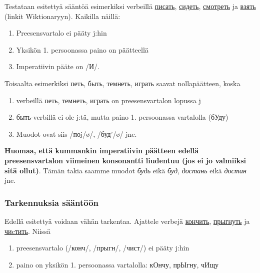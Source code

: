\documentclass[]{scrartcl}
\providecommand{\tightlist}{%
  \setlength{\itemsep}{0pt}\setlength{\parskip}{0pt}}
\begin{document}
Testataan esitettyä sääntöä esimerkiksi verbeillä
\href{http://ru.wiktionary.org/wiki/\%D0\%BF\%D0\%B8\%D1\%81\%D0\%B0\%D1\%82\%D1\%8C}{писать},
\href{http://ru.wiktionary.org/wiki/\%D1\%81\%D0\%B8\%D0\%B4\%D0\%B5\%D1\%82\%D1\%8C}{сидеть},
\href{http://ru.wiktionary.org/wiki/\%D1\%81\%D0\%BC\%D0\%BE\%D1\%82\%D1\%80\%D0\%B5\%D1\%82\%D1\%8C}{смотреть}
ja
\href{http://ru.wiktionary.org/wiki/\%D0\%B2\%D0\%B7\%D1\%8F\%D1\%82\%D1\%8C}{взять}
(linkit Wiktionaryyn). Kaikilla näillä:

\begin{enumerate}
\def\labelenumi{\arabic{enumi}.}
\tightlist
\item
  Preesensvartalo ei pääty j:hin
\item
  Yksikön 1. persoonassa paino on päätteellä
\item
  Imperatiivin pääte on /И/.
\end{enumerate}

Toisaalta esimerkiksi петь, быть, темнеть, играть saavat nollapäätteen,
koska

\begin{enumerate}
\def\labelenumi{\arabic{enumi}.}
\tightlist
\item
  verbeillä петь, темнеть, играть on preesensvartalon lopussa j
\item
  быть-verbillä ei ole j:tä, mutta paino 1. persoonassa vartalolla
  (бУду)
\item
  Muodot ovat siis /поj/ø/, /буд'/ø/ jne.
\end{enumerate}

\textbf{Huomaa, että kummankin imperatiivin päätteen edellä
preesensvartalon viimeinen konsonantti liudentuu (jos ei jo valmiiksi
sitä ollut)}. Tämän takia saamme muodot \emph{будь} eikä \emph{буд},
\emph{достань} eikä \emph{достан} jne.

\subsubsection{Tarkennuksia
sääntöön}\label{tarkennuksia-suxe4uxe4ntuxf6uxf6n}

Edellä esitettyä voidaan vähän tarkentaa. Ajattele verbejä
\href{http://ru.wiktionary.org/wiki/\%D0\%BA\%D0\%BE\%D0\%BD\%D1\%87\%D0\%B8\%D1\%82\%D1\%8C}{кончить},
\href{http://ru.wiktionary.org/wiki/\%D0\%BF\%D1\%80\%D1\%8B\%D0\%B3\%D0\%BD\%D1\%83\%D1\%82\%D1\%8C}{прыгнуть}
ja \href{http://ru.wiktionary.org/wiki/\%D1\%87\%D0\%B8cтить}{чиcтить}.
Niissä

\begin{enumerate}
\def\labelenumi{\arabic{enumi}.}
\tightlist
\item
  preesensvartalo (/конч/, /прыгн/, /чист/) ei pääty j:hin
\item
  paino on yksikön 1. persoonassa vartalolla: кОнчу, прЫгну, чИщу
\end{enumerate}
\end{document}
